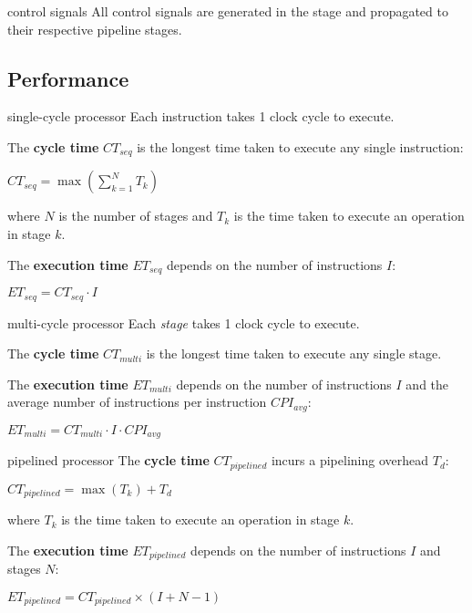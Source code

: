 \begin{defn}{control signals}
    All control signals are generated in the  stage and propagated to their
    respective pipeline stages.

    \begin{itemize}
    \end{itemize}
\end{defn}

\subsection{Performance}

\begin{defn}{single-cycle processor}
    Each instruction takes 1 clock cycle to execute.

    The \textbf{cycle time} $CT_{seq}$ is the longest time taken to execute any single instruction:

    \( CT_{seq} = \max \left( \sum_{k=1}^{N} T_k \right) \)

    where $N$ is the number of stages and $T_k$ is the time taken to execute an operation in stage $k$.

    The \textbf{execution time} $ET_{seq}$ depends on the number of instructions $I$:
    
    \( ET_{seq} = CT_{seq} \cdot I \)
\end{defn}

\begin{defn}{multi-cycle processor}
    Each \textit{stage} takes 1 clock cycle to execute.

    The \textbf{cycle time} $CT_{multi}$ is the longest time taken to execute any single stage.

    The \textbf{execution time} $ET_{multi}$ depends on the number of instructions $I$ and the average
    number of instructions per instruction $CPI_{avg}$:
    
    \( ET_{multi} = CT_{multi} \cdot I \cdot CPI_{avg} \)
\end{defn}

\begin{defn}{pipelined processor}
    The \textbf{cycle time} $CT_{pipelined}$ incurs a pipelining overhead $T_d$:

    \( CT_{pipelined} = \max \left( T_k \right) + T_d \)

    where $T_k$ is the time taken to execute an operation in stage $k$.

    The \textbf{execution time} $ET_{pipelined}$ depends on the number of instructions $I$ and stages $N$:
    
    \( ET_{pipelined} = CT_{pipelined} \times (I + N - 1) \)
\end{defn}

